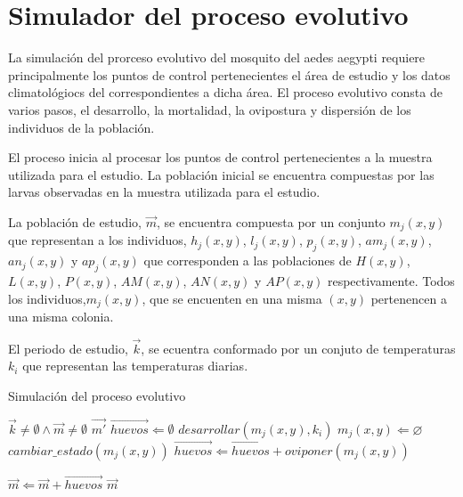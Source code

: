 \section{Simulador del proceso evolutivo}
La simulación del prorceso evolutivo del mosquito del aedes aegypti requiere principalmente los
puntos de control pertenecientes el área de estudio y los datos climatológiocs del correspondientes
a dicha área. El proceso evolutivo consta de varios pasos, el desarrollo, la mortalidad,
la ovipostura y dispersión de los individuos de la población.

El proceso inicia al procesar los puntos de control pertenecientes a la muestra utilizada para el
estudio. La población inicial se encuentra compuestas por las larvas observadas en la muestra
utilizada para el estudio.

La población de estudio, $\vec{m}$, se encuentra compuesta por un conjunto $m_{j}(x,y)$ que representan a los individuos, $h_{j}(x,y)$, $l_{j}(x,y)$, $p_{j}(x,y)$, $am_{j}(x,y)$,
$an_{j}(x,y)$ y $ap_{j}(x,y)$ que corresponden a las poblaciones de $H(x,y)$, $L(x,y)$, $P(x,y)$,
$AM(x,y)$, $AN(x,y)$ y $AP(x,y)$ respectivamente. Todos los individuos,$m_{j}(x,y)$, que se
encuenten en una misma $(x, y)$ pertenencen a una misma colonia.

El periodo de estudio, $\vec{k}$, se ecuentra conformado por un conjuto de temperaturas $k_{i}$
que representan las temperaturas diarias.

\begin{algorithm}
\caption{Simulación del proceso evolutivo}
\label{alg:simulador-evolutivo}
\begin{algorithmic}[1]
    \REQUIRE $\vec{k}\neq \emptyset \land \vec{m} \neq \emptyset$
    \ENSURE $\vec{m'}$
        \STATE $\vec{huevos} \Leftarrow \emptyset$
            \STATE $desarrollar(m_{j}(x, y), k_{i})$
                \STATE {}
                \STATE $m_{j}(x, y) \Leftarrow \varnothing $
                \STATE $ cambiar\_estado(m_{j}(x, y)) $
                \STATE $\vec{huevos} \Leftarrow \vec{huevos} + oviponer(m_{j}(x, y))$
            \ENDIF
        \ENDFOR

            \STATE {}
            \STATE $\vec{m} \Leftarrow  \vec{m} + \vec{huevos}$
        \ENDIF
    \ENDFOR
    \RETURN $\vec{m}$
\end{algorithmic}
\end{algorithm}

